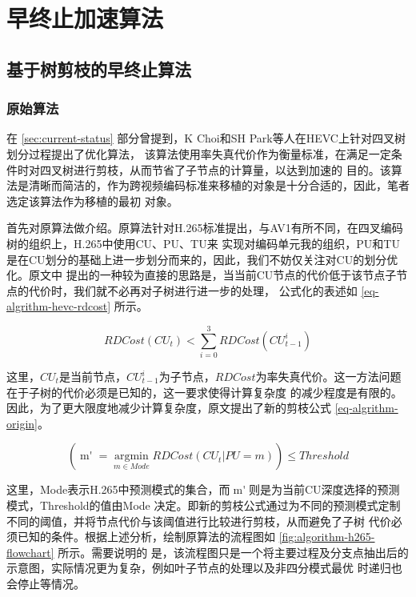 \chapter{早终止加速算法}
\label{cha:algorithm}

\section{基于树剪枝的早终止算法}

\subsection{原始算法}

在 \ref{sec:current-status} 部分曾提到，K Choi和SH Park等人在HEVC上针对四叉树划分过程提出了优化算法，
该算法使用率失真代价作为衡量标准，在满足一定条件时对四叉树进行剪枝，从而节省了子节点的计算量，以达到加速的
目的。该算法是清晰而简洁的，作为跨视频编码标准来移植的对象是十分合适的，因此，笔者选定该算法作为移植的最初
对象。


首先对原算法做介绍。原算法针对H.265标准提出，与AV1有所不同，在四叉编码树的组织上，H.265中使用CU、PU、TU来
实现对编码单元我的组织，PU和TU是在CU划分的基础上进一步划分而来的，因此，我们不妨仅关注对CU的划分优化。原文中
提出的一种较为直接的思路是，当当前CU节点的代价低于该节点子节点的代价时，我们就不必再对子树进行进一步的处理，
公式化的表述如 \ref{eq-algrithm-hevc-rdcost} 所示。

\begin{equation}
\label{eq-algrithm-hevc-rdcost}
RDCost(CU_t) < \sum_{i=0}^3 RDCost(CU^i_{t-1})
\end{equation}


这里，$CU_t$是当前节点，$CU^i_{t-1}$为子节点，$RDCost$为率失真代价。这一方法问题在于子树的代价必须是已知的，这一要求使得计算复杂度
的减少程度是有限的。因此，为了更大限度地减少计算复杂度，原文提出了新的剪枝公式 \ref{eq-algrithm-origin}。

\begin{equation}
\label{eq-algrithm-origin}
(\mathop{m'} =  \mathop{argmin}\limits_{m \in Mode} RDCost(CU_t | PU=m)) \le Threshold 
\end{equation}

这里，Mode表示H.265中预测模式的集合，而$\mathop{m'}$则是为当前CU深度选择的预测模式，Threshold的值由Mode
决定。即新的剪枝公式通过为不同的预测模式定制不同的阈值，并将节点代价与该阈值进行比较进行剪枝，从而避免了子树
代价必须已知的条件。根据上述分析，绘制原算法的流程图如 \ref{fig:algorithm-h265-flowchart} 所示。需要说明的
是，该流程图只是一个将主要过程及分支点抽出后的示意图，实际情况更为复杂，例如叶子节点的处理以及非四分模式最优
时递归也会停止等情况。

